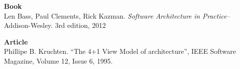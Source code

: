 




















\begin{thebibliography}{9}
	\textbf{Book} \\
	Len Bass, Paul Clements, Rick Kazman.
	\emph{Software Architecture in Practice–}
	Addison-Wesley.
	3rd edition,
	2012

	\textbf{Article} \\
	Phillipe B. Kruchten.
	“The 4+1 View Model of architecture”, 
	IEEE Software Magazine,
	Volume 12,
	Issue 6, 1995.
	
\end{thebibliography}


